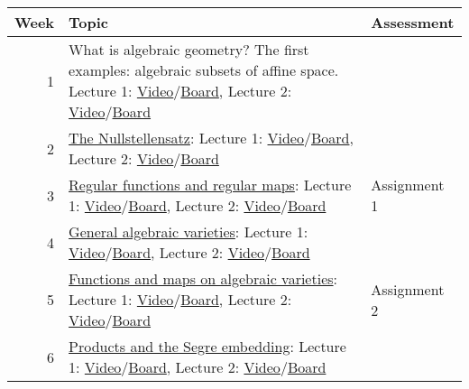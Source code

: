 \documentclass[11pt]{article}
\begin{document}
\begin{center}
\begin{tabular}{rll}
\hline
Week & Topic & Assessment\\
\hline
1 & What is algebraic geometry? The first examples: algebraic subsets of affine space. Lecture 1: \href{https://web.microsoftstream.com/video/cf234444-df4b-4b65-8016-a3c1b7539891?channelId=cd4289e5-e630-458c-8ea0-2bd2632faea0}{Video}/\href{notes/2021-07-27.pdf}{Board}, Lecture 2: \href{https://web.microsoftstream.com/video/9baf2139-0fa8-4419-89f2-aabff250de07?channelId=cd4289e5-e630-458c-8ea0-2bd2632faea0}{Video}/\href{notes/2021-07-08.pdf}{Board} & \\
2 & \href{classwork02.pdf}{The Nullstellensatz}: Lecture 1: \href{https://web.microsoftstream.com/video/307216ea-46a1-40dd-9389-7bde7ea8b439?channelId=cd4289e5-e630-458c-8ea0-2bd2632faea0}{Video}/\href{notes/2021-08-02.pdf}{Board}, Lecture 2: \href{https://web.microsoftstream.com/video/a3127e92-540d-47a2-8c8f-66e8e2411163?list=studio}{Video}/\href{notes/2021-08-06.pdf}{Board} & \\
3 & \href{classwork03.pdf}{Regular functions and regular maps}: Lecture 1: \href{https://web.microsoftstream.com/video/ca9210bf-b61b-4b1f-a077-8a78c29b404e}{Video}/\href{notes/2021-08-09.pdf}{Board}, Lecture 2: \href{https://web.microsoftstream.com/video/048c9983-30be-400e-9e1b-a6019c369b83}{Video}/\href{notes/2021-08-13.pdf}{Board} & Assignment 1\\
4 & \href{classwork04.pdf}{General algebraic varieties}: Lecture 1: \href{https://web.microsoftstream.com/video/aff3b45e-5fbd-44e7-b655-1e19277560f9}{Video}/\href{notes/2021-08-16.pdf}{Board}, Lecture 2: \href{https://web.microsoftstream.com/video/34028770-b503-41f0-95f4-20377a1cc55a?list=studio}{Video}/\href{notes/2021-08-20.pdf}{Board} & \\
5 & \href{classwork05.pdf}{Functions and maps on algebraic varieties}: Lecture 1: \href{https://web.microsoftstream.com/video/248369c8-6e61-4746-a301-eafc8c7b8853}{Video}/\href{notes/2021-08-23.pdf}{Board}, Lecture 2: \href{https://web.microsoftstream.com/video/8efe045b-4d50-4e82-bb62-2042fa7678c9}{Video}/\href{notes/2021-08-27.pdf}{Board} & Assignment 2\\
6 & \href{classwork06.pdf}{Products and the Segre embedding}: Lecture 1: \href{https://web.microsoftstream.com/video/8ce2960f-c731-4001-9772-2bc88f34d8fa}{Video}/\href{notes/2021-08-30.pdf}{Board}, Lecture 2: \href{https://web.microsoftstream.com/video/f5f36337-3a49-4adf-84f6-87d0ef80229d}{Video}/\href{notes/2021-09-03.pdf}{Board} & \\

\end{tabular}
\end{center}
\end{document}
